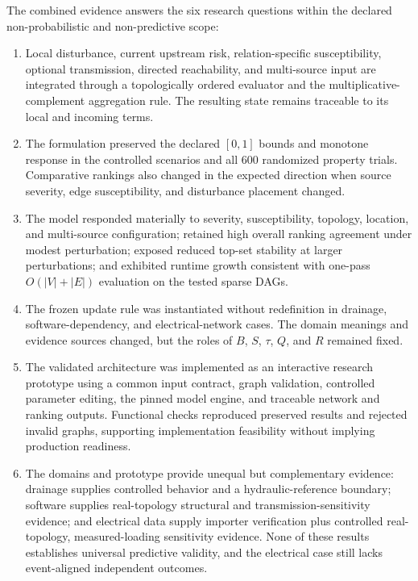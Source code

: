 The combined evidence answers the six research questions within the
declared non-probabilistic and non-predictive scope:

\begin{enumerate}[label=\textbf{RQ\arabic*.},leftmargin=*]
  \item Local disturbance, current upstream risk, relation-specific
  susceptibility, optional transmission, directed reachability, and
  multi-source input are integrated through a topologically ordered
  evaluator and the multiplicative-complement aggregation rule. The
  resulting state remains traceable to its local and incoming terms.
  \item The formulation preserved the declared $[0,1]$ bounds and
  monotone response in the controlled scenarios and all 600 randomized
  property trials. Comparative rankings also changed in the expected
  direction when source severity, edge susceptibility, and disturbance
  placement changed.
  \item The model responded materially to severity, susceptibility,
  topology, location, and multi-source configuration; retained high
  overall ranking agreement under modest perturbation; exposed reduced
  top-set stability at larger perturbations; and exhibited runtime growth
  consistent with one-pass $O(|V|+|E|)$ evaluation on the tested sparse
  DAGs.
  \item The frozen update rule was instantiated without redefinition in
  drainage, software-dependency, and electrical-network cases. The
  domain meanings and evidence sources changed, but the roles of $B$,
  $S$, $\tau$, $Q$, and $R$ remained fixed.
  \item The validated architecture was implemented as an interactive
  research prototype using a common input contract, graph validation,
  controlled parameter editing, the pinned model engine, and traceable
  network and ranking outputs. Functional checks reproduced preserved
  results and rejected invalid graphs, supporting implementation
  feasibility without implying production readiness.
  \item The domains and prototype provide unequal but complementary evidence: drainage
  supplies controlled behavior and a hydraulic-reference boundary;
  software supplies real-topology structural and transmission-sensitivity
  evidence; and electrical data supply importer verification plus
  controlled real-topology, measured-loading sensitivity evidence. None
  of these results establishes universal predictive validity, and the
  electrical case still lacks event-aligned independent outcomes.
\end{enumerate}

